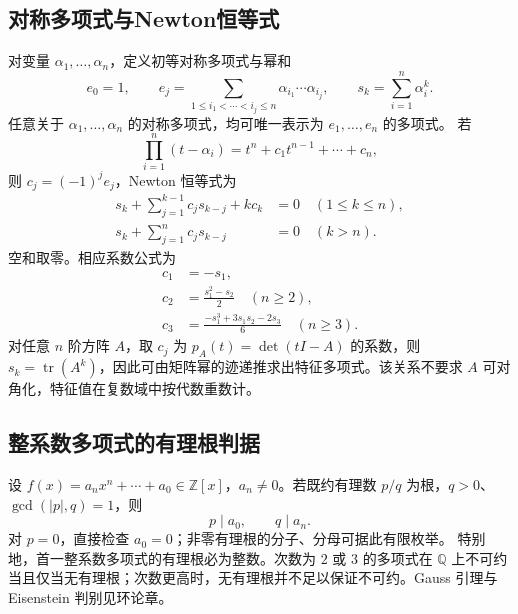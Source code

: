 \documentclass[../main.tex]{subfiles}
\begin{document}
\subsection{对称多项式与Newton恒等式}
对变量 $\alpha_1,\ldots,\alpha_n$，定义初等对称多项式与幂和
\[
e_0=1,\qquad
e_j=\sum_{1\le i_1<\cdots<i_j\le n}\alpha_{i_1}\cdots\alpha_{i_j},\qquad
s_k=\sum_{i=1}^n\alpha_i^k.
\]
任意关于 $\alpha_1,\ldots,\alpha_n$ 的对称多项式，均可唯一表示为 $e_1,\ldots,e_n$ 的多项式。
若
\[
\prod_{i=1}^n(t-\alpha_i)=t^n+c_1t^{n-1}+\cdots+c_n,
\]
则 $c_j=(-1)^je_j$，Newton 恒等式为
\begin{align*}
s_k+\sum_{j=1}^{k-1}c_js_{k-j}+kc_k&=0\quad(1\le k\le n),\\
s_k+\sum_{j=1}^nc_js_{k-j}&=0\quad(k>n).
\end{align*}
空和取零。相应系数公式为
\begin{align*}
c_1&=-s_1,\\
c_2&=\frac{s_1^2-s_2}{2}\quad(n\ge2),\\
c_3&=\frac{-s_1^3+3s_1s_2-2s_3}{6}\quad(n\ge3).
\end{align*}
对任意 $n$ 阶方阵 $A$，取 $c_j$ 为 $p_A(t)=\det(tI-A)$ 的系数，则 $s_k=\operatorname{tr}(A^k)$，因此可由矩阵幂的迹递推求出特征多项式。该关系不要求 $A$ 可对角化，特征值在复数域中按代数重数计。
\subsection{整系数多项式的有理根判据}
设 $f(x)=a_nx^n+\cdots+a_0\in\mathbb Z[x]$，$a_n\ne0$。若既约有理数 $p/q$ 为根，$q>0$、$\gcd(|p|,q)=1$，则
\[
p\mid a_0,\qquad q\mid a_n.
\]
对 $p=0$，直接检查 $a_0=0$；非零有理根的分子、分母可据此有限枚举。
特别地，首一整系数多项式的有理根必为整数。次数为 $2$ 或 $3$ 的多项式在 $\mathbb Q$ 上不可约当且仅当无有理根；次数更高时，无有理根并不足以保证不可约。Gauss 引理与 Eisenstein 判别见环论章。
\end{document}
